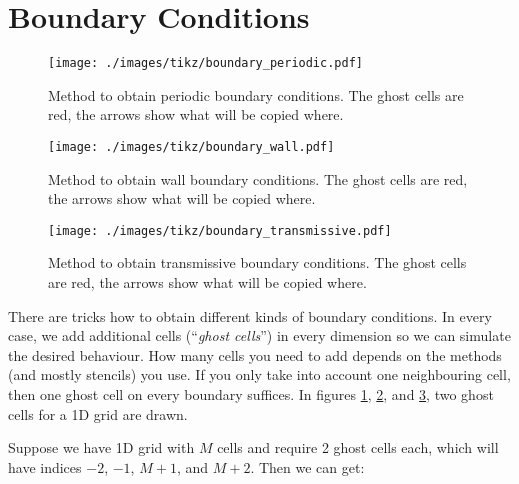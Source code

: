 \section{Boundary Conditions}



\begin{figure}[htbp]
	\texttt{[image: ./images/tikz/boundary\_periodic.pdf]}%
	\caption{\label{fig:boundary_periodic}
		Method to obtain periodic boundary conditions.
		The ghost cells are red, the arrows show what will be copied where.
	}
\end{figure}



\begin{figure}[htbp]
	\texttt{[image: ./images/tikz/boundary\_wall.pdf]}%
	\caption{\label{fig:boundary_wall}
		Method to obtain wall boundary conditions.
		The ghost cells are red, the arrows show what will be copied where.
	}
\end{figure}



\begin{figure}[htbp]
	\texttt{[image: ./images/tikz/boundary\_transmissive.pdf]}%
	\caption{\label{fig:boundary_transmissive}
		Method to obtain transmissive boundary conditions.
		The ghost cells are red, the arrows show what will be copied where.
	}
\end{figure}



There are tricks how to obtain different kinds of boundary conditions.
In every case, we add additional cells (``\emph{ghost cells}'') in every dimension so we can simulate the desired behaviour.
How many cells you need to add depends on the methods (and mostly stencils) you use.
If you only take into account one neighbouring cell, then one ghost cell on every boundary suffices.
In figures \ref{fig:boundary_periodic}, \ref{fig:boundary_wall}, and \ref{fig:boundary_transmissive}, two ghost cells for a 1D grid are drawn.


Suppose we have 1D grid with $M$ cells and require 2 ghost cells each, which will have indices $-2$, $-1$, $M+1$, and $M+2$.
Then we can get:

